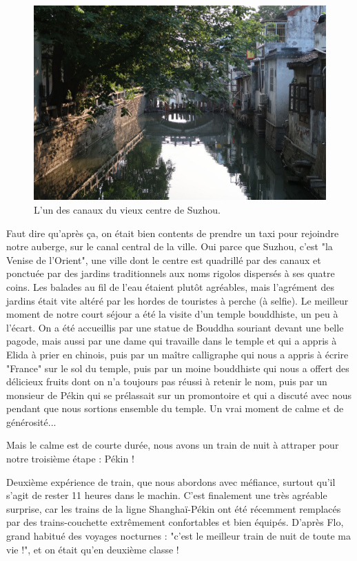 \begin{figure}
\centering
\includegraphics{images/20180616_suzhou.JPG}
\caption{L'un des canaux du vieux centre de Suzhou.}
\end{figure}

Faut dire qu'après ça, on était bien contents de prendre un taxi pour
rejoindre notre auberge, sur le canal central de la ville. Oui parce que
Suzhou, c'est "la Venise de l'Orient", une ville dont le centre est
quadrillé par des canaux et ponctuée par des jardins traditionnels aux
noms rigolos dispersés à ses quatre coins. Les balades au fil de l'eau
étaient plutôt agréables, mais l'agrément des jardins était vite altéré
par les hordes de touristes à perche (à selfie). Le meilleur moment de
notre court séjour a été la visite d'un temple bouddhiste, un peu à
l'écart. On a été accueillis par une statue de Bouddha souriant devant
une belle pagode, mais aussi par une dame qui travaille dans le temple
et qui a appris à Elida à prier en chinois, puis par un maître
calligraphe qui nous a appris à écrire "France" sur le sol du temple,
puis par un moine bouddhiste qui nous a offert des délicieux fruits dont
on n'a toujours pas réussi à retenir le nom, puis par un monsieur de
Pékin qui se prélassait sur un promontoire et qui a discuté avec nous
pendant que nous sortions ensemble du temple. Un vrai moment de calme et
de générosité...

Mais le calme est de courte durée, nous avons un train de nuit à
attraper pour notre troisième étape : Pékin !

Deuxième expérience de train, que nous abordons avec méfiance, surtout
qu'il s'agit de rester 11 heures dans le machin. C'est finalement une
très agréable surprise, car les trains de la ligne Shanghaï-Pékin ont
été récemment remplacés par des trains-couchette extrêmement
confortables et bien équipés. D'après Flo, grand habitué des voyages
nocturnes : "c'est le meilleur train de nuit de toute ma vie !", et on
était qu'en deuxième classe !

